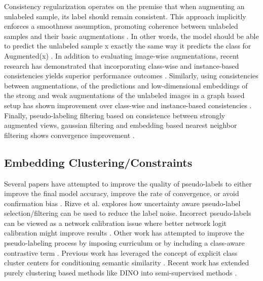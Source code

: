 \documentclass[10pt,twocolumn,letterpaper]{article}
\begin{document}
Consistency regularization operates on the premise that when augmenting an unlabeled sample, its label should remain consistent. 
This approach implicitly enforces a smoothness assumption, promoting coherence between unlabeled samples and their basic augmentations \cite{xie2020unsupervised}. 
In other words, the model should be able to predict the unlabeled sample x exactly the same way it predicts the class for Augmented(x) \cite{berthelot2019mixmatch,sohn2020fixmatch,berthelot2019remixmatch,mustafa2020transformation}. 
In addition to evaluating image-wise augmentations, recent research has demonstrated that incorporating class-wise and instance-based consistencies yields superior performance outcomes \cite{zheng2022simmatch,li2021comatch}. 
Similarly, using consistencies between augmentations, of the predictions and low-dimensional embeddings of the strong and weak augmentations of the unlabeled images in a graph based setup has shown improvement over class-wise and instance-based consistencies \cite{zheng2023simmatchv2}.
Finally, pseudo-labeling filtering based on consistence between strongly augmented views, gaussian filtering and embedding based nearest neighbor filtering shows convergence improvement \cite{kim2022conmatch,menon2022semisupervised}.

\subsection{Embedding Clustering/Constraints}


Several papers have attempted to improve the quality of pseudo-labels to either improve the final model accuracy, improve the rate of convergence, or avoid confirmation bias \cite{arazo2020pseudo}.
Rizve et al. \cite{rizve2021defense} explores how uncertainty aware pseudo-label selection/filtering can be used to reduce the label noise.
Incorrect pseudo-labels can be viewed as a network calibration issue \cite{rizve2021defense} where better network logit calibration might improve results \cite{Xing2020DistanceBased}.
Other work has attempted to improve the pseudo-labeling process by imposing curriculum \cite{zhang2021flexmatch} or by including a class-aware contrastive term \cite{yang2022class}.
Previous work has leveraged the concept of explicit class cluster centers for conditioning semantic similarity \cite{zheng2022simmatch}.
Recent work has extended purely clustering based methods like DINO \cite{caron2021emerging} into semi-supervised methods \cite{fini2023semi}.
\end{document}
